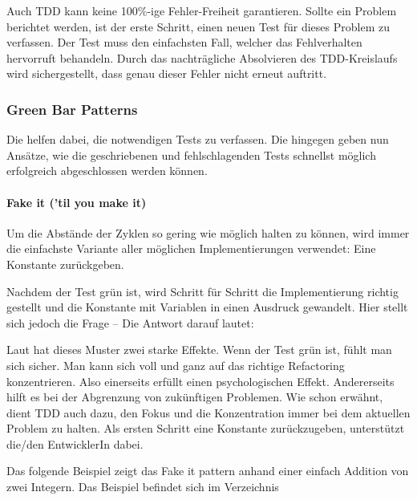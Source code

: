 {Auch TDD kann keine 100\%-ige Fehler-Freiheit garantieren. Sollte ein Problem berichtet werden, ist der erste Schritt, einen neuen Test für dieses Problem zu verfassen. Der Test muss den einfachsten Fall, welcher das Fehlverhalten hervorruft behandeln. Durch das nachträgliche Absolvieren des TDD-Kreislaufs wird sichergestellt, dass genau dieser Fehler nicht erneut auftritt.

\subsubsection{Green Bar Patterns}

Die  helfen dabei, die notwendigen Tests zu verfassen. Die  hingegen geben nun Ansätze, wie die geschriebenen und fehlschlagenden Tests schnellst möglich erfolgreich abgeschlossen werden können.

\paragraph{Fake it ('til you make it)}

Um die Abstände der  Zyklen so gering wie möglich halten zu können, wird immer die einfachste Variante aller möglichen Implementierungen verwendet: Eine Konstante zurückgeben.

Nachdem der Test grün ist, wird Schritt für Schritt die Implementierung richtig gestellt und die Konstante mit Variablen in einen Ausdruck gewandelt. Hier stellt sich jedoch die Frage  -- Die Antwort darauf lautet: 

Laut \cite[152]{Beck:2003} hat dieses Muster zwei starke Effekte. Wenn der Test grün ist, fühlt man sich sicher. Man kann sich voll und ganz auf das richtige Refactoring konzentrieren. Also einerseits erfüllt  einen psychologischen Effekt. Andererseits hilft es bei der Abgrenzung von zukünftigen Problemen. Wie schon erwähnt, dient TDD auch dazu, den Fokus und die Konzentration immer bei dem aktuellen Problem zu halten. Als ersten Schritt eine Konstante zurückzugeben, unterstützt die/den EntwicklerIn dabei.

Das folgende Beispiel zeigt das Fake it pattern anhand einer einfach Addition von zwei Integern. Das Beispiel befindet sich im Verzeichnis 

}
